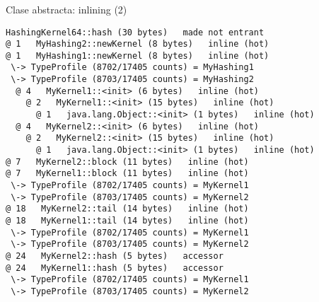 \begin{frame}[fragile]
  \frametitle{\ft}
  \begin{block}{Clase abstracta: inlining (2)}
    \begin{lstlisting}[basicstyle=\tiny]
HashingKernel64::hash (30 bytes)   made not entrant
@ 1   MyHashing2::newKernel (8 bytes)   inline (hot)
@ 1   MyHashing1::newKernel (8 bytes)   inline (hot)
 \-> TypeProfile (8702/17405 counts) = MyHashing1
 \-> TypeProfile (8703/17405 counts) = MyHashing2
  @ 4   MyKernel1::<init> (6 bytes)   inline (hot)
    @ 2   MyKernel1::<init> (15 bytes)   inline (hot)
      @ 1   java.lang.Object::<init> (1 bytes)   inline (hot)
  @ 4   MyKernel2::<init> (6 bytes)   inline (hot)
    @ 2   MyKernel2::<init> (15 bytes)   inline (hot)
      @ 1   java.lang.Object::<init> (1 bytes)   inline (hot)
@ 7   MyKernel2::block (11 bytes)   inline (hot)
@ 7   MyKernel1::block (11 bytes)   inline (hot)
 \-> TypeProfile (8702/17405 counts) = MyKernel1
 \-> TypeProfile (8703/17405 counts) = MyKernel2
@ 18   MyKernel2::tail (14 bytes)   inline (hot)
@ 18   MyKernel1::tail (14 bytes)   inline (hot)
 \-> TypeProfile (8702/17405 counts) = MyKernel1
 \-> TypeProfile (8703/17405 counts) = MyKernel2
@ 24   MyKernel2::hash (5 bytes)   accessor
@ 24   MyKernel1::hash (5 bytes)   accessor
 \-> TypeProfile (8702/17405 counts) = MyKernel1
 \-> TypeProfile (8703/17405 counts) = MyKernel2
    \end{lstlisting}
  \end{block}
\end{frame}


